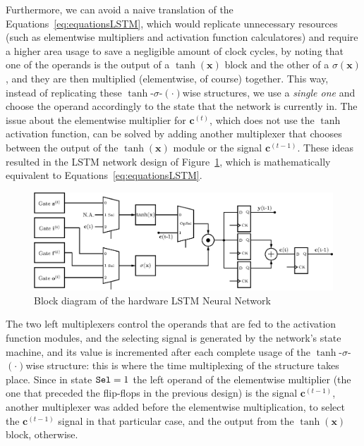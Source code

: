 \documentclass{IEEEtran}
\newcommand{\mb}[1]{\mathbf{#1}}
\begin{document}
Furthermore, we can avoid a naive translation of the Equations~\ref{eq:equationsLSTM}, which would replicate unnecessary resources (such as elementwise multipliers
and activation function calculatores) and require a higher area usage to save a negligible amount of clock cycles, by noting that one of the operands is the output
of a $\tanh(\mb{x})$ block and the other of a $\sigma(\mb{x})$, and they are then multiplied (elementwise, of course) together. This way, instead of replicating
these $\tanh$-$\sigma$-$(\cdot)$wise structures, we use a \emph{single one} and choose the operand accordingly to the state that the network is currently in. The
issue about the elementwise multiplier for $\mb{c}^{(t)}$, which does not use the $\tanh$ activation function, can be solved by adding another multiplexer that chooses
between the output of the $\tanh(\mb{x})$ module or the signal $\mb{c}^{(t-1)}$. These ideas resulted in the LSTM network design of Figure~\ref{fig:network-opt}, which
is mathematically equivalent to Equations~\ref{eq:equationsLSTM}.

\begin{figure}
    \centering
    \includegraphics[width=0.9\linewidth]{figures/network-opt.eps}
    \caption[Block diagram of the hardware LSTM Neural Network]{Block diagram of the hardware LSTM Neural Network}
    \label{fig:network-opt}
\end{figure}
The two left multiplexers control the operands that are fed to the activation function modules, and the selecting signal is generated by the network's state machine,
and its value is incremented after each complete usage of the $\tanh$-$\sigma$-$(\cdot)$wise structure: this is where the time multiplexing of the structure takes place.
Since in state $\verb+Sel+=1$ the left operand of the elementwise multiplier (the one that preceded the flip-flops in the previous design) is the signal $\mb{c}^{(t-1)}$,
another multiplexer was added before the elementwise multiplication, to select the $\mb{c}^{(t-1)}$ signal in that particular case, and the output from the $\tanh(\mb{x})$ block, otherwise.
\end{document}
